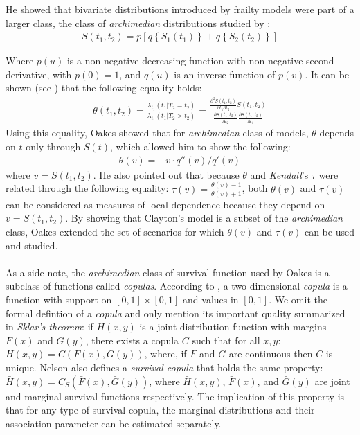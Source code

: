 \documentclass[]{article}
\begin{document}
He showed that bivariate distributions introduced by frailty models were part of a larger class, the class of \emph{archimedian} distributions studied by \cite{genest1986copules}:
$$
\begin{aligned}
	S(t_1,t_2) = p\left[ q\left\{ S_1(t_1) \right\}  + q\left\{ S_2(t_2) \right\}  \right]
\end{aligned}
$$

Where $p(u)$ is a non-negative decreasing function with non-negative second derivative, with $p(0)=1$, and $q(u)$ is an inverse function of $p(v)$. It can be shown (see ) that  the following equality holds:
	$$
	\begin{aligned}
		\theta(t_1,t_2) = \frac{\lambda_{t_1}(t_1|T_2=t_2)}{\lambda_{t_1}(t_1|T_2>t_2)} = \frac{ \frac{\partial^2 S(t_1,t_2)}{\partial t_1 \partial t_2} S(t_1, t_2)}    {\frac{\partial S(t_1, t_2)}{\partial t_2} \frac{\partial S(t_1, t_2)}{\partial t_1}}
	\end{aligned}
	$$
Using this equality, Oakes showed that for \emph{archimedian} class of models, $\theta$ depends on $t$ only through $S(t)$, which allowed him to show the following:
$$
\begin{aligned}
\theta(v) = -v\cdot q''(v)/q'(v)
\end{aligned}
$$
where $v=S(t_1, t_2)$. He also pointed out that because $\theta$ and \emph{Kendall}'s $\tau$ were related through the following equality: $\tau(v) = \frac{\theta(v)-1}{\theta(v)+1}$, both $\theta(v)$ and $\tau(v)$ can be considered as measures of local dependence because they depend on $v=S(t_1, t_2)$. By showing that Clayton's model is a subset of the \emph{archimedian} class, Oakes extended the set of scenarios for which $\theta(v)$ and $\tau(v)$ can be used and studied.\\
~\\
As a side note, the \emph{archimedian} class of survival function used by Oakes is a subclass of functions called \emph{copulas}. According to \cite{nelsen2007introduction}, a two-dimensional \emph{copula} is a function with support on $[0, 1] \times [0, 1]$ and values in $[0, 1]$. We omit the formal defintion of a \emph{copula} and only mention its important quality summarized in \emph{Sklar's theorem}: if $H(x,y)$ is a joint distribution function with margins $F(x)$ and $G(y)$, there exists a copula $C$ such that for all $x,y$: $H(x,y) = C(F(x), G(y))$, where, if $F$ and $G$ are continuous then $C$ is unique. Nelson also defines a \emph{survival copula} that holds the same property: $\bar{H}(x,y) = C_S(\bar{F}(x), \bar{G}(y))$, where $\bar{H}(x,y)$, $\bar{F}(x)$, and $\bar{G}(y)$ are joint and marginal survival functions respectively. The implication of this property is that for any type of survival copula, the marginal distributions and their association parameter can be estimated separately. 
\end{document}
